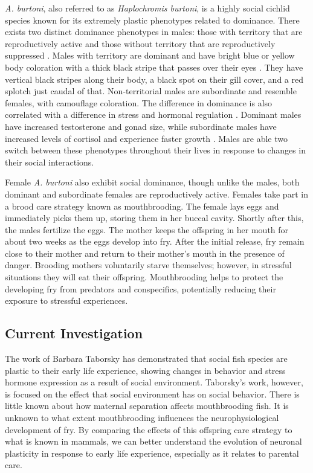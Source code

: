 \documentclass[12pt,twoside]{reedthesis}
\begin{document}
 \textit{A. burtoni}, also referred to as \textit{Haplochromis burtoni}, is a
 highly social cichlid species known for its extremely plastic phenotypes related to
 dominance. There exists two distinct dominance phenotypes in males:
those with territory that are reproductively active and those without territory
that are reproductively suppressed \citep{fernald_quantitative_1977}. Males with
territory are dominant and have bright blue or yellow body coloration with a thick black
stripe that passes over their eyes \citep{border_color_2019}. They have vertical black stripes along their
body, a black spot on their gill cover, and a red splotch just caudal of that.
Non-territorial males are subordinate and resemble females, with camouflage coloration.
The difference in dominance is also correlated with a difference in stress and
hormonal regulation \citep{renn_fish_2008}. Dominant males have increased testosterone and gonad
size, while subordinate males have increased levels of
cortisol and experience faster growth \citep{francis_social_1993, renn_fish_2008}. Males are
able two switch between these phenotypes throughout their lives in response to
changes in their social interactions.

Female \textit{A. burtoni} also exhibit social dominance, though unlike the
males, both dominant and subordinate females are reproductively active. Females take part in a brood care strategy known as mouthbrooding. The female lays eggs and immediately picks them up, storing them in
her buccal cavity. Shortly after this, the males fertilize the eggs. The
mother keeps the offspring in her mouth for about two weeks as the eggs
develop into fry. After the initial release, fry remain close to their mother
and return to their mother's mouth in the presence of danger. Brooding
mothers voluntarily starve themselves; however, in stressful situations they
will eat their offspring. Mouthbrooding helps to protect the developing fry from
predators and conspecifics, potentially reducing their exposure to stressful experiences.

\subsection{Current Investigation}
 
The work of Barbara Taborsky has demonstrated that social fish species are
plastic to their early life experience, showing changes in behavior and stress
hormone expression as a result of social environment. Taborsky's work, however, is focused on the effect that social
environment has on social behavior. There is little known about how maternal
separation affects mouthbrooding fish. It is unknown to what extent
mouthbrooding influences the neurophysiological development of fry. By comparing
the effects of this offspring care strategy to what is known in mammals, we can
better understand the evolution of neuronal plasticity in response to early life
experience, especially as it relates to parental care. 
\end{document}
